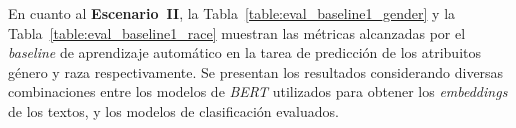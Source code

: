 \begin{table}[htpb]
    \centering
    \caption{Resumen de m\'etricas de concordancia entre \emph{ChatGPT} y el corpus final.}
    \label{table:agreement_gpt}
\end{table}

En cuanto al \textbf{Escenario~II}, la Tabla~\ref{table:eval_baseline1_gender} y la Tabla~\ref{table:eval_baseline1_race}
muestran las m\'etricas alcanzadas por el \emph{baseline} de aprendizaje autom\'atico en la tarea de 
predicci\'on de los atribuitos g\'enero y raza respectivamente. Se presentan los resultados considerando 
diversas combinaciones entre los modelos de \emph{BERT} utilizados para obtener los \emph{embeddings} de los textos, y los
modelos de clasificaci\'on evaluados. 

